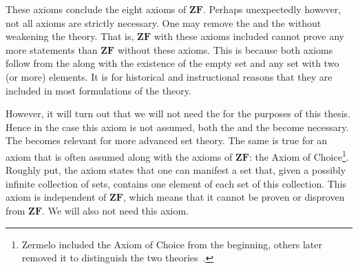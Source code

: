 \documentclass[../main.tex]{subfiles}
\begin{document}
These axioms conclude the eight axioms of $\mathbf{ZF}$. Perhaps unexpectedly however, not all axioms are strictly necessary. One may remove the  and the  without weakening the theory. That is, $\mathbf{ZF}$ with these axioms included cannot prove any more statements than $\mathbf{ZF}$ without these axioms. This is because both axioms follow from the  along with the existence of the empty set and any set with two (or more) elements. It is for historical and instructional reasons that they are included in most formulations of the theory.

However, it will turn out that we will not need the  for the purposes of this thesis. Hence in the case this axiom is not assumed, both the  and the  become necessary. The  becomes relevant for more advanced set theory. The same is true for an axiom that is often assumed along with the axioms of $\mathbf{ZF}$: the Axiom of Choice\footnote{Zermelo included the Axiom of Choice from the beginning, others later removed it to distinguish the two theories~\cite{Zermelo1908}.}. Roughly put, the axiom states that one can manifest a set that, given a possibly infinite collection of sets, contains one element of each set of this collection. This axiom is independent of $\mathbf{ZF}$, which means that it cannot be proven or disproven from $\mathbf{ZF}$. We will also not need this axiom.
\end{document}
